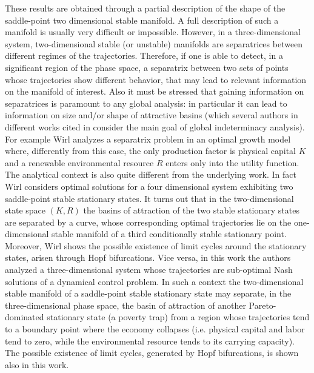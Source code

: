 These results are obtained through a partial description of the shape of the saddle-point two dimensional stable manifold. A full description of such a manifold is usually very difficult or impossible. However, in a three-dimensional system, two-dimensional stable (or unstable) manifolds are separatrices between different regimes of the trajectories. Therefore, if one is able to detect, in a significant region of the phase space, a separatrix between two sets of points whose trajectories show different behavior, that may lead to relevant information on the manifold of interest. Also it must be stressed that gaining information on separatrices is paramount to any global analysis: in particular it can lead to information on size and/or shape of attractive basins (which several authors in different works cited in \cite{antoci_poverty_2011} consider the main goal of global indeterminacy analysis).\\ 
For example Wirl \cite{wirl_sustainable_2004} analyzes a separatrix problem in an optimal growth model where, differently from this case, the only production factor is physical capital $K$ and a renewable environmental resource $R$ enters only into the utility function. The analytical context is also quite different from the underlying work. In fact Wirl considers optimal solutions for a four dimensional system exhibiting two saddle-point stable stationary states. It turns out that in the two-dimensional state space $(K,R)$ the basins of attraction of the two stable stationary states are separated by a curve, whose corresponding optimal trajectories lie on the one-dimensional stable manifold of a third conditionally stable stationary point. Moreover, Wirl shows the possible existence of limit cycles around the stationary states, arisen through Hopf bifurcations. Vice versa, in this work the authors analyzed a three-dimensional system whose trajectories are sub-optimal Nash solutions of a dynamical control problem. In such a context the two-dimensional stable manifold of a saddle-point stable stationary state may separate, in the three-dimensional phase space, the basin of attraction of another Pareto-dominated stationary state (a poverty trap) from a region whose trajectories tend to a boundary point where the economy collapses (i.e. physical capital and labor tend to zero, while the environmental resource tends to its carrying capacity). The possible existence of limit cycles, generated by Hopf bifurcations, is shown also in this work.


